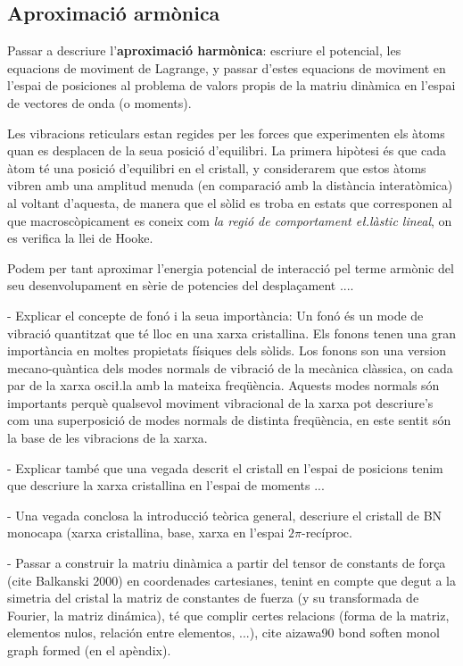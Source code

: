 \documentclass[12pt,twoside,a4paper, notitlepage]{article}%
\begin{document}
\subsection{Aproximació armònica}
Passar a descriure l'\textbf{aproximació harmònica}: escriure el potencial, les equacions de moviment de Lagrange, y passar d'estes equacions de moviment en l'espai de posiciones al problema de valors propis de la matriu dinàmica en l'espai de vectores de onda (o moments).

Les vibracions reticulars estan regides per les forces que experimenten els àtoms quan es desplacen de la seua posició d'equilibri. La primera hipòtesi és que cada àtom té una posició d'equilibri en el cristall, y considerarem que estos àtoms vibren amb una amplitud menuda (en comparació amb la distància interatòmica) al voltant d'aquesta, de manera que el sòlid es troba en estats que corresponen al que macroscòpicament es coneix com \textit{la regió de comportament e\l.làstic lineal}, on es verifica la llei de Hooke.

Podem per tant aproximar l'energia potencial de interacció pel terme armònic del seu desenvolupament en sèrie de potencies del despla\c{c}ament ....


- Explicar el concepte de fonó i la seua importància: Un fonó és un mode de vibració quantitzat que té lloc en una xarxa cristallina. Els fonons tenen una gran importància en moltes propietats físiques dels sòlids. Los fonons son una version mecano-quàntica dels modes normals de vibració de la mecànica clàssica, on cada par de la xarxa osci\l.la amb la mateixa freqüència. Aquests modes normals són importants perquè qualsevol moviment vibracional de la xarxa pot descriure's com una superposició de modes normals de distinta freqüència, en este sentit són la base de les vibracions de la xarxa.

- Explicar també que una vegada descrit el cristall en l'espai de posicions tenim que descriure la xarxa cristallina en l'espai de moments ...

- Una vegada conclosa la introducció teòrica general, descriure el cristall de BN monocapa (xarxa cristallina, base, xarxa en l'espai $2\pi\text{-recíproc}$.

- Passar a construir la matriu dinàmica a partir del tensor de constants de for\c{c}a (cite Balkanski 2000) en coordenades cartesianes, tenint en compte que degut a la simetria del cristal la matriz de constantes de fuerza (y su transformada de Fourier, la matriz dinámica), té que complir certes relacions (forma de la matriz, elementos nulos, relación entre elementos, ...), cite aizawa90 bond soften monol graph formed (en el apèndix). 
\end{document}
